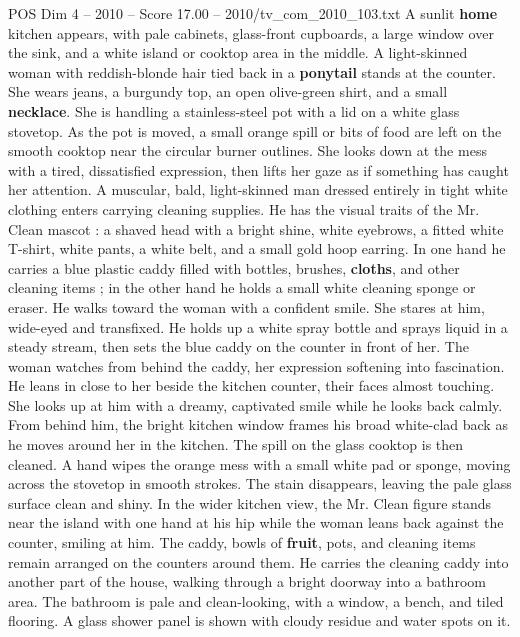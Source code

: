\begin{textsample}{POS Dim 4 – 2010 – Score 17.00 – 2010/tv\_com\_2010\_103.txt}  \label{ex:f4_pos_027}
A sunlit \textbf{home} kitchen appears, with pale cabinets, glass-front cupboards, a large window over the sink, and a white island or cooktop area in the middle.
A light-skinned woman with reddish-blonde hair tied back in a \textbf{ponytail} stands at the counter.
She wears jeans, a burgundy top, an open olive-green shirt, and a small \textbf{necklace}.
She is handling a stainless-steel pot with a lid on a white glass stovetop.
As the pot is moved, a small orange spill or bits of food are left on the smooth cooktop near the circular burner outlines.
She looks down at the mess with a tired, dissatisfied expression, then lifts her gaze as if something has caught her attention.
A muscular, bald, light-skinned man dressed entirely in tight white clothing enters carrying cleaning supplies.
He has the visual traits of the Mr.
Clean mascot : a shaved head with a bright shine, white eyebrows, a fitted white T-shirt, white pants, a white belt, and a small gold hoop earring.
In one hand he carries a blue plastic caddy filled with bottles, brushes, \textbf{cloths}, and other cleaning items ; in the other hand he holds a small white cleaning sponge or eraser.
He walks toward the woman with a confident smile.
She stares at him, wide-eyed and transfixed.
He holds up a white spray bottle and sprays liquid in a steady stream, then sets the blue caddy on the counter in front of her.
The woman watches from behind the caddy, her expression softening into fascination.
He leans in close to her beside the kitchen counter, their faces almost touching.
She looks up at him with a dreamy, captivated smile while he looks back calmly.
From behind him, the bright kitchen window frames his broad white-clad back as he moves around her in the kitchen.
The spill on the glass cooktop is then cleaned.
A hand wipes the orange mess with a small white pad or sponge, moving across the stovetop in smooth strokes.
The stain disappears, leaving the pale glass surface clean and shiny.
In the wider kitchen view, the Mr.
Clean figure stands near the island with one hand at his hip while the woman leans back against the counter, smiling at him.
The caddy, bowls of \textbf{fruit}, pots, and cleaning items remain arranged on the counters around them.
He carries the cleaning caddy into another part of the house, walking through a bright doorway into a bathroom area.
The bathroom is pale and clean-looking, with a window, a bench, and tiled flooring.
A glass shower panel is shown with cloudy residue and water spots on it.

\end{textsample}
